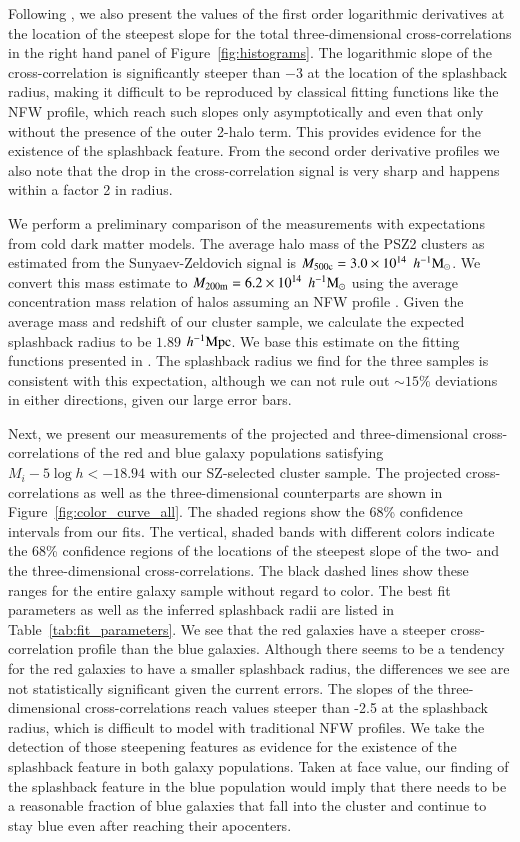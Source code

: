 \documentclass[iop, apjl, twocolappendix, numberedappendix]{emulateapj}
\def\mpch{h^{-1}{\rm Mpc}}
\def\msunh{h^{-1}{\rm M_{\odot}}}
\begin{document}
Following \citet{baxter2017halo}, we also present the values of the
first order logarithmic derivatives at the location of the steepest slope for
the total three-dimensional cross-correlations in the right hand panel of
Figure~\ref{fig:histograms}. The logarithmic slope of the 
cross-correlation is significantly steeper than $-3$ at the location 
of the splashback radius, making it difficult to
be reproduced by classical fitting functions like the NFW profile,
which reach such slopes only asymptotically and even that only
without the presence of the outer 2-halo term. This provides
evidence for the existence of the splashback feature. From the second
order derivative profiles we also note that the drop in the cross-correlation
signal is very sharp and happens within a factor 2 in radius.

We perform a preliminary comparison of the measurements with
expectations from cold dark matter models. The average halo mass of
the PSZ2 clusters as estimated from the Sunyaev-Zeldovich signal
is $M_{\rm 500c}=3.0\times10^{14}$ $\msunh$. We convert this mass
estimate to $M_{\rm 200m}=6.2\times10^{14}$ $\msunh$ using the average
concentration mass relation of halos assuming an NFW profile
\citep{HuKravtsov:2003}. Given the average mass and redshift of our
cluster sample, we calculate the expected splashback radius to be
$1.89$ $\mpch$. We base this estimate on the fitting functions
presented in \citet{more2015splashback}. The splashback radius we
find for the three samples is consistent with this expectation,
although we can not rule out $\sim 15\%$ deviations in either directions,
given our large error bars.

Next, we present our measurements of the projected and
three-dimensional cross-correlations of the red and blue galaxy populations
satisfying $M_{i}-5\log h<-18.94$ with our SZ-selected cluster
sample. The projected cross-correlations as well as the three-dimensional 
counterparts are shown in Figure~\ref{fig:color_curve_all}. The shaded regions show
the 68\% confidence intervals from our fits. The vertical, shaded
bands with different colors indicate the 68\% confidence regions of
the locations of the steepest slope of the two- and the
three-dimensional cross-correlations. The black dashed lines show
these ranges for the entire galaxy sample without regard to color.
The best fit parameters as well as the inferred splashback radii are
listed in Table~\ref{tab:fit_parameters}. We
see that the red galaxies have a steeper cross-correlation profile
than the blue galaxies. Although there seems to be  a tendency for the red
galaxies to have a smaller splashback radius, the differences we see
are not statistically significant given the current errors. The
slopes of the three-dimensional cross-correlations reach values
steeper than -2.5 at the splashback radius, which is difficult to model with
traditional NFW profiles. We take the detection of those steepening features 
as evidence for the existence of the splashback feature in both galaxy populations.
Taken at face value, our finding of the splashback feature in the blue
population would imply that there needs to be a reasonable fraction of
blue galaxies that fall into the cluster and continue to stay blue
even after reaching their apocenters.
\end{document}
